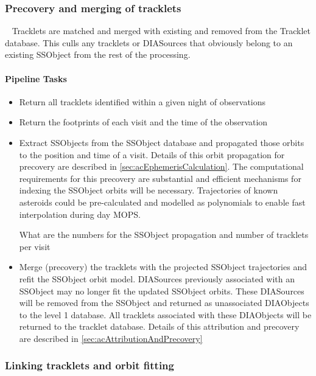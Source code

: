 \subsubsection{Precovery and merging of tracklets}~
Tracklets are matched and merged with existing \SSObjects and removed from the Tracklet database. This culls any tracklets or DIASources that obviously belong to an existing SSObject from the rest of the processing. 

\paragraph{Pipeline Tasks}

\begin{itemize}
\item Return all tracklets identified within a given night of observations
\item Return the footprints of each visit and the time of the observation
\item Extract SSObjects from the SSObject database and propagated those orbits to the position and time of a visit. Details of this orbit propagation for precovery are described in \ref{sec:acEphemerisCalculation}. The computational requirements for this precovery are substantial and efficient mechanisms for indexing the SSObject orbits will be necessary. Trajectories of known asteroids could be pre-calculated and modelled as polynomials to enable fast interpolation during day MOPS.
\begin{note}What are the numbers for the SSObject propagation and number of tracklets per visit\end{note}
\item Merge (precovery) the tracklets with the projected SSObject trajectories and refit  the SSObject orbit model. DIASources previously associated with an SSObject may no longer fit the updated SSObject orbits. These DIASources will be removed from the SSObject and returned as unassociated DIAObjects to the level 1 database. All tracklets associated with these DIAObjects will be  returned to the tracklet database. Details of this attribution and precovery are described in \ref{sec:acAttributionAndPrecovery}
\end{itemize}

\subsubsection{Linking tracklets and orbit fitting}~

